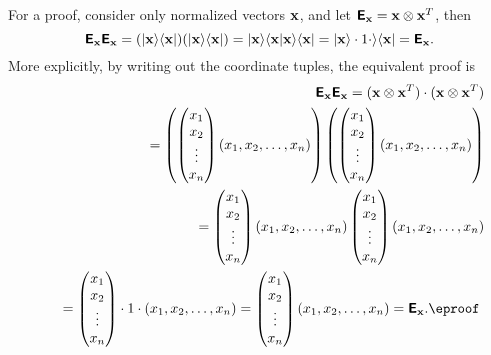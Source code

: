 {\color{OliveGreen}
\bproof
For a proof, consider only normalized vectors ${\bf x}$, and
let $\textsf{\textbf{E}}_{\bf x} = {\bf x}\otimes {\bf x}^T $,
then
$$
\textsf{\textbf{E}}_{\bf x}\textsf{\textbf{E}}_{\bf x}
=
(\vert{\bf x}\rangle \langle {\bf x}\vert)
(\vert{\bf x}\rangle \langle {\bf x}\vert)
=
\vert{\bf x}\rangle \langle {\bf x}\vert {\bf x}\rangle \langle {\bf x}\vert
=\vert{\bf x}\rangle \cdot 1 \cdot \rangle \langle {\bf x}\vert
=  \textsf{\textbf{E}}_{\bf x}.
$$
More explicitly, by writing out the coordinate tuples, the equivalent proof is
\begin{equation}
\begin{split}
\textsf{\textbf{E}}_{\bf x}\textsf{\textbf{E}}_{\bf x}
= ({\bf x}\otimes {\bf x}^T ) \cdot ({\bf x}\otimes {\bf x}^T )
\\
\qquad
=
\left(
\begin{pmatrix}
x_1\\
x_2\\
\vdots \\
x_n
\end{pmatrix}
(x_1,x_2,\ldots ,x_n)
\right)
\left(
\begin{pmatrix}
x_1\\
x_2\\
\vdots \\
x_n
\end{pmatrix}
(x_1,x_2,\ldots ,x_n)
 \right)
\\
\qquad
=
\begin{pmatrix}
x_1\\
x_2\\
\vdots \\
x_n
\end{pmatrix}
(x_1,x_2,\ldots ,x_n)
\begin{pmatrix}
x_1\\
x_2\\
\vdots \\
x_n
\end{pmatrix}
(x_1,x_2,\ldots ,x_n)
\\
\qquad
=
\begin{pmatrix}
x_1\\
x_2\\
\vdots \\
x_n
\end{pmatrix}
\cdot 1 \cdot
(x_1,x_2,\ldots ,x_n)
=
\begin{pmatrix}
x_1\\
x_2\\
\vdots \\
x_n
\end{pmatrix}
(x_1,x_2,\ldots ,x_n)
=\textsf{\textbf{E}}_{\bf x}. \textrm{\eproof }
\end{split}
\end{equation}
}


